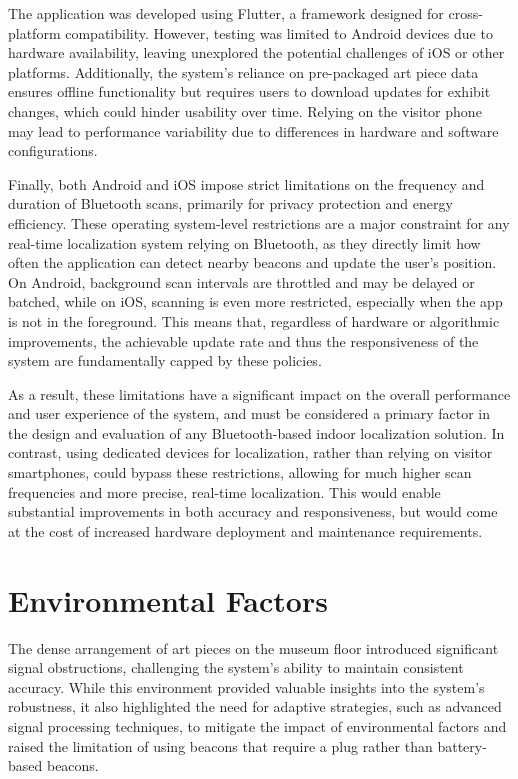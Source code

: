 The application was developed using Flutter, a framework designed for cross-platform compatibility. However, testing was limited to Android devices due to hardware availability, leaving unexplored the potential challenges of iOS or other platforms. Additionally, the system’s reliance on pre-packaged art piece data ensures offline functionality but requires users to download updates for exhibit changes, which could hinder usability over time. Relying on the visitor phone may lead to performance variability due to differences in hardware and software configurations. 


Finally, both Android and iOS impose strict limitations on the frequency and duration of Bluetooth scans, primarily for privacy protection and energy efficiency. These operating system-level restrictions are a major constraint for any real-time localization system relying on Bluetooth, as they directly limit how often the application can detect nearby beacons and update the user's position. On Android, background scan intervals are throttled and may be delayed or batched, while on iOS, scanning is even more restricted, especially when the app is not in the foreground. This means that, regardless of hardware or algorithmic improvements, the achievable update rate and thus the responsiveness of the system are fundamentally capped by these policies.

As a result, these limitations have a significant impact on the overall performance and user experience of the system, and must be considered a primary factor in the design and evaluation of any Bluetooth-based indoor localization solution. In contrast, using dedicated devices for localization, rather than relying on visitor smartphones, could bypass these restrictions, allowing for much higher scan frequencies and more precise, real-time localization. This would enable substantial improvements in both accuracy and responsiveness, but would come at the cost of increased hardware deployment and maintenance requirements.

\section{Environmental Factors}
The dense arrangement of art pieces on the museum floor introduced significant signal obstructions, challenging the system’s ability to maintain consistent accuracy. While this environment provided valuable insights into the system’s robustness, it also highlighted the need for adaptive strategies, such as advanced signal processing techniques, to mitigate the impact of environmental factors and raised the limitation of using beacons that require a plug rather than battery-based beacons.

